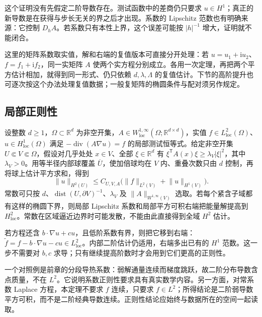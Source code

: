 这个证明没有先假定二阶导数存在。测试函数中的差商仍只要求 \(u\in H^1\)；真正的新导数是在获得与步长无关的界之后才出现。系数的 Lipschitz 范数也有明确来源：它控制 \(D_hA\)。若系数只有本性上界，这个误差可能按 \(|h|^{-1}\) 增大，证明就不能闭合。

这里的矩阵系数取实值，解和右端的复值版本可直接分开处理：若 \(u=u_1+\mathrm i u_2\)、\(f=f_1+\mathrm i f_2\)，同一实矩阵 \(A\) 使两个实方程分别成立。各用一次定理，再把两个平方估计相加，就得到同一形式、仍只依赖 \(d,\lambda,\Lambda\) 的复值估计。下节的高阶提升也可逐次按这个办法处理复值数据；一般复矩阵的椭圆条件与配对须另作规定。

\subsection{局部正则性}
\label{b2:subsec:160103}

设整数 \(d\geq1\)，\(\Omega\subset\mathbb R^d\) 为非空开集，\(A\in W_{\mathrm{loc}}^{1,\infty}(\Omega;\mathbb R^{d\times d})\)，实值 \(f\in L_{\mathrm{loc}}^2(\Omega)\)、\(u\in H_{\mathrm{loc}}^1(\Omega)\) 满足 \(-\operatorname{div}(A\nabla u)=f\) 的局部测试恒等式。给定非空开集 \(U\Subset V\Subset\Omega\)，假设对几乎处处 \(x\in V\)、全部 \(\xi\in\mathbb R^d\) 有 \(\xi^{\mathsf T}A(x)\xi\geq\lambda_V|\xi|^2\)，其中 \(\lambda_V>0\)。用等半径内部球覆盖 \(\overline U\)，使加倍球均在 \(V\) 内、重叠次数只由 \(d\) 控制，再将球上估计平方求和，得到
\[\lVert u\rVert_{H^2(U)}\le C_{U,V,A}\bigl(\lVert f\rVert_{L^2(V)}+\lVert u\rVert_{H^1(V)}\bigr).\]
常数可只按 \(d\)、\(\operatorname{dist}(U,\partial V)^{-1}\)、\(\lambda_V\) 及 \(\|A\|_{W^{1,\infty}(V)}\) 选取。若每个紧含子域都有这样的椭圆下界，则局部 Lipschitz 系数和局部平方可积右端把能量解提高到 \(H_{\mathrm{loc}}^2\)。常数在区域逼近边界时可能发散，不能由此直接得到全域 \(H^2\) 估计。

\ProseParagraphBreak

若方程还含 \(b\cdot\nabla u+cu\)，且低阶系数有界，则把它移到右端：\(\widetilde f=f-b\cdot\nabla u-cu\in L_{\mathrm{loc}}^2\)。内部二阶估计仍适用，右端多出已有的 \(H^1\) 范数。这一步不需要对 \(b,c\) 求导；只有继续提高阶数时才会用到它们更高的正则性。

\ProseParagraphBreak

一个对照例是前章的分段导热系数：弱解通量连续而梯度跳跃，故二阶分布导数含点质量，不在 \(L^2\)。它说明系数正则性要求具有真实数学内容。另一方面，对常系数 Laplace 方程，本定理不要求 \(f\) 连续，只要求 \(f\in L^2\)；所得结论是二阶弱导数平方可积，而不是二阶经典导数连续。正则性结论应始终与数据所在的空间一起读取。
